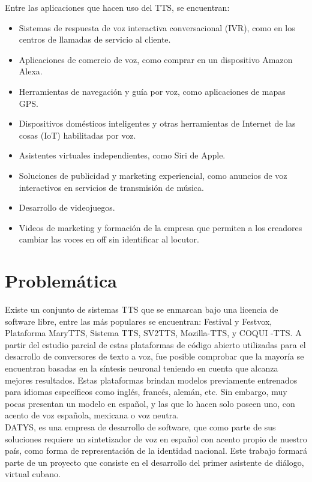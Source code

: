 Entre las aplicaciones que hacen uso del TTS, se encuentran:

\begin{itemize}
	\item Sistemas de respuesta de voz interactiva conversacional (IVR), como en los centros de llamadas de servicio al cliente.
	
	\item Aplicaciones de comercio de voz, como comprar en un dispositivo Amazon Alexa.
	\item Herramientas de navegación y guía por voz, como aplicaciones de mapas GPS.
	\item Dispositivos domésticos inteligentes y otras herramientas de Internet de las cosas (IoT) habilitadas por voz.
	\item Asistentes virtuales independientes, como Siri de Apple.
	\item Soluciones de publicidad y marketing experiencial, como anuncios de voz interactivos en servicios de transmisión de música.
	\item Desarrollo de videojuegos.
	\item Videos de marketing y formación de la empresa que permiten a los creadores cambiar las	voces en off sin identificar al locutor.
\end{itemize}

\section*{Problemática}
Existe un conjunto de sistemas TTS que se enmarcan bajo una licencia de software libre, entre las más populares se encuentran: Festival y Festvox, Plataforma MaryTTS, Sistema TTS, SV2TTS, Mozilla-TTS, y COQUI -TTS. A partir del estudio parcial de estas plataformas de código abierto utilizadas para el desarrollo de conversores de texto a voz, fue posible comprobar que la mayoría se encuentran basadas en la síntesis neuronal teniendo en cuenta que alcanza mejores resultados. Estas plataformas brindan modelos previamente entrenados para idiomas específicos como inglés, francés, alemán, etc. Sin embargo, muy pocas presentan un modelo en español, y las que lo hacen solo poseen uno, con acento de voz española, mexicana o voz neutra.\\

DATYS, es una empresa de desarrollo de software, que como parte de sus soluciones requiere un sintetizador de voz en español con acento propio de nuestro país, como forma de representación de la identidad nacional. Este trabajo formará parte de un proyecto que consiste en el desarrollo del primer asistente de diálogo, virtual cubano. 

